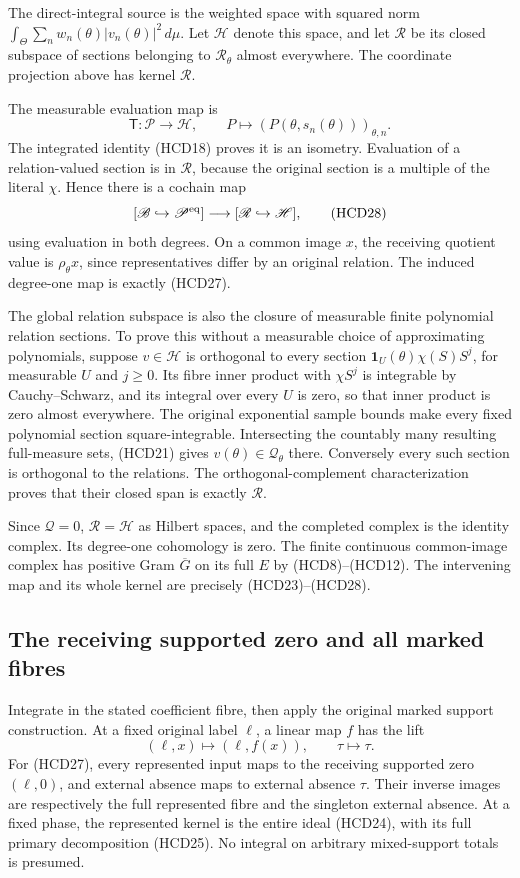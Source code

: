 The direct-integral source is the weighted space with squared
norm $\int_\Theta\sum_n w_n(\theta)|v_n(\theta)|^2\,d\mu$.
Let $\mathscr H$ denote this space, and let $\mathscr R$
be its closed subspace of sections belonging to
$\mathcal R_\theta$ almost everywhere. The coordinate
projection above has kernel $\mathscr R$.

The measurable evaluation map is
\[
 \mathsf T:\mathscr P\longrightarrow\mathscr H,\qquad
 P\longmapsto(P(\theta,s_n(\theta)))_{\theta,n}.
\]
The integrated identity (HCD18) proves it is an isometry.
Evaluation of a relation-valued section is in $\mathscr R$,
because the original section is a multiple of the literal
$\chi$. Hence there is a cochain map
\[
 [\mathscr B\hookrightarrow\mathscr P^{\rm eq}]
 \longrightarrow[\mathscr R\hookrightarrow\mathscr H],
 \tag{HCD28}
\]
using evaluation in both degrees. On a common image $x$,
the receiving quotient value is $\rho_\theta x$, since
representatives differ by an original relation.
The induced degree-one map is exactly (HCD27).

The global relation subspace is also the closure of measurable
finite polynomial relation sections. To prove this without
a measurable choice of approximating polynomials, suppose
$v\in\mathscr H$ is orthogonal to every section
$\mathbf1_U(\theta)\chi(S)S^j$, for measurable $U$ and $j\ge0$.
Its fibre inner product with $\chi S^j$ is integrable by
Cauchy--Schwarz, and its integral over every $U$ is zero,
so that inner product is zero almost everywhere.
The original exponential sample bounds make every fixed
polynomial section square-integrable.
Intersecting the countably many resulting full-measure sets,
(HCD21) gives $v(\theta)\in\mathcal Q_\theta$ there.
Conversely every such section is orthogonal to the relations.
The orthogonal-complement characterization proves that their
closed span is exactly $\mathscr R$.

Since $\mathscr Q=0$, $\mathscr R=\mathscr H$ as Hilbert
spaces, and the completed complex is the identity complex.
Its degree-one cohomology is zero. The finite continuous
common-image complex has positive Gram $\overline G$
on its full $E$ by (HCD8)--(HCD12).
The intervening map and its whole kernel are precisely
(HCD23)--(HCD28).

\subsection{The receiving supported zero and all marked fibres}

Integrate in the stated coefficient fibre, then apply the
original marked support construction. At a fixed original
label $\ell$, a linear map $f$ has the lift
\[
 (\ell,x)\longmapsto(\ell,f(x)),\qquad
 \tau\longmapsto\tau.
 \tag{HCD29}
\]
For (HCD27), every represented input maps to the receiving
supported zero $(\ell,0)$, and external absence maps to
external absence $\tau$. Their inverse images are respectively
the full represented fibre and the singleton external absence.
At a fixed phase, the represented kernel is the entire
ideal (HCD24), with its full primary decomposition (HCD25).
No integral on arbitrary mixed-support totals is presumed.

